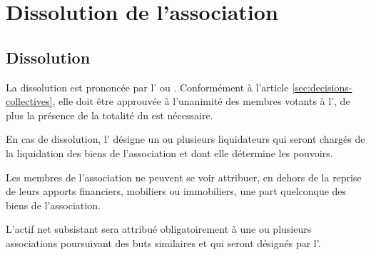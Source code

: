 \documentclass[a4paper,french,10pt]{article}
\newcommand{\article}[1]{\subsection{#1}\addtocounter{article}{1}}
\newcounter{article}
\newcommand{\artref}[1]{article \ref{#1}}
\begin{document}
\section{Dissolution de l’association}

\article{Dissolution}
\label{sec:dissolution}
La dissolution est prononcée par l'\AGO{} ou \AGE{}. Conformément à l'\artref{sec:decisions-collectives}, elle doit être approuvée à l'unanimité des membres votants à l'\AG{}, de plus la présence de la totalité du \bureau{} est nécessaire.

En cas de dissolution, l’\AG{} désigne un ou plusieurs
liquidateurs qui seront chargés de la liquidation des biens de
l’association et dont elle détermine les pouvoirs.

Les membres de l’association ne peuvent se voir attribuer, en dehors
de la reprise de leurs apports financiers, mobiliers ou immobiliers,
une part quelconque des biens de l’association.

L’actif net subsistant sera attribué obligatoirement à une ou
plusieurs associations poursuivant des buts similaires et qui seront
désignés par l’\AG{}.
\end{document}
